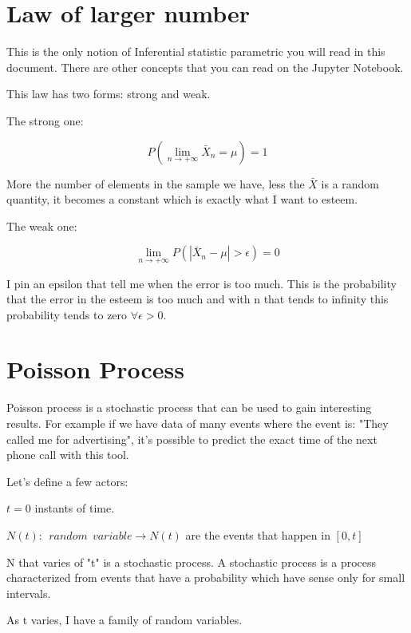\documentclass{article}
\begin{document}
\section{Law of larger number}

This is the only notion of Inferential statistic parametric you will read in this document. There are other concepts that you can read on the Jupyter Notebook.

This law has two forms: strong and weak.

\bigskip

The strong one:

$$P\left(\lim_{n \rightarrow + \infty} \bar X_n =\mu\right) = 1$$

More the number of elements in the sample we have, less the $\bar X$ is a random quantity, it becomes a constant which is exactly what I want to esteem.


\bigskip

The weak one:

$$\lim_{n \rightarrow + \infty} P\left(|\bar X_n - \mu| > \epsilon\right) = 0$$

I pin an epsilon that tell me when the error is too much. This is the probability that the error in the esteem is too much and with n that tends to infinity this probability tends to zero $\forall \epsilon > 0$.

\section{Poisson Process}

Poisson process is a stochastic process that can be used to gain interesting results. For example if we have data of many events where the event is: "They called me for advertising", it's possible to predict the exact time of the next phone call with this tool.

\bigskip

Let's define a few actors: 

$t = 0$ instants of time.

$N(t): \ \ random \ \ variable \rightarrow N(t)$ are the events that happen in $[0,t]$

\bigskip

N that varies of "t" is a stochastic process. A stochastic process is a process characterized from events that have a probability which have sense only for small intervals.

As t varies, I have a family of random variables.
\end{document}
